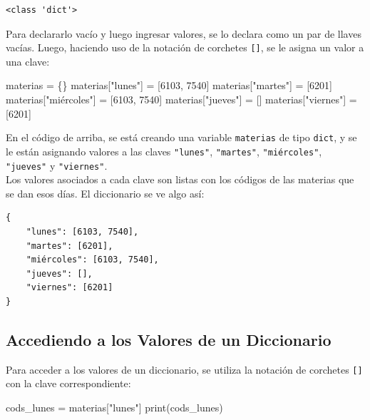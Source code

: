 \documentclass[
  letterpaper,
  DIV=11,
  numbers=noendperiod]{scrreprt}
\newenvironment{Shaded}{\begin{snugshade}}{\end{snugshade}}
\newcommand{\BuiltInTok}[1]{\textcolor[rgb]{0.00,0.23,0.31}{#1}}
\newcommand{\DecValTok}[1]{\textcolor[rgb]{0.68,0.00,0.00}{#1}}
\newcommand{\NormalTok}[1]{\textcolor[rgb]{0.00,0.23,0.31}{#1}}
\newcommand{\OperatorTok}[1]{\textcolor[rgb]{0.37,0.37,0.37}{#1}}
\newcommand{\StringTok}[1]{\textcolor[rgb]{0.13,0.47,0.30}{#1}}
\begin{document}
\begin{verbatim}
<class 'dict'>
\end{verbatim}

Para declararlo vacío y luego ingresar valores, se lo declara como un
par de llaves vacías. Luego, haciendo uso de la notación de corchetes
\texttt{{[}{]}}, se le asigna un valor a una clave:

\begin{Shaded}
\begin{Highlighting}[]
\NormalTok{materias }\OperatorTok{=}\NormalTok{ \{\}}
\NormalTok{materias[}\StringTok{"lunes"}\NormalTok{] }\OperatorTok{=}\NormalTok{ [}\DecValTok{6103}\NormalTok{, }\DecValTok{7540}\NormalTok{]}
\NormalTok{materias[}\StringTok{"martes"}\NormalTok{] }\OperatorTok{=}\NormalTok{ [}\DecValTok{6201}\NormalTok{]}
\NormalTok{materias[}\StringTok{"miércoles"}\NormalTok{] }\OperatorTok{=}\NormalTok{ [}\DecValTok{6103}\NormalTok{, }\DecValTok{7540}\NormalTok{]}
\NormalTok{materias[}\StringTok{"jueves"}\NormalTok{] }\OperatorTok{=}\NormalTok{ []}
\NormalTok{materias[}\StringTok{"viernes"}\NormalTok{] }\OperatorTok{=}\NormalTok{ [}\DecValTok{6201}\NormalTok{]}
\end{Highlighting}
\end{Shaded}

En el código de arriba, se está creando una variable \texttt{materias}
de tipo \texttt{dict}, y se le están asignando valores a las claves
\texttt{"lunes"}, \texttt{"martes"}, \texttt{"miércoles"},
\texttt{"jueves"} y \texttt{"viernes"}.\\
Los valores asociados a cada clave son listas con los códigos de las
materias que se dan esos días. El diccionario se ve algo así:

\begin{verbatim}
{
    "lunes": [6103, 7540],
    "martes": [6201],
    "miércoles": [6103, 7540],
    "jueves": [],
    "viernes": [6201]
}
\end{verbatim}

\subsection{Accediendo a los Valores de un
Diccionario}\label{accediendo-a-los-valores-de-un-diccionario}

Para acceder a los valores de un diccionario, se utiliza la notación de
corchetes \texttt{{[}{]}} con la clave correspondiente:

\begin{Shaded}
\begin{Highlighting}[]
\NormalTok{cods\_lunes }\OperatorTok{=}\NormalTok{ materias[}\StringTok{"lunes"}\NormalTok{]}
\BuiltInTok{print}\NormalTok{(cods\_lunes)}
\end{Highlighting}
\end{Shaded}
\end{document}
